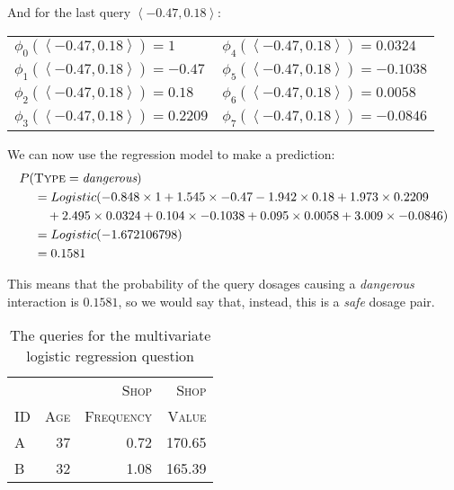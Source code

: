 \documentclass[solution]{ditpaper}
\begin{document}
\begin{enumerate}
\begin{answer}
And for the last query $\left<-0.47, 0.18\right>$:
			\begin{center}
\begin{tabular}[ht]{ l  l  }
$\phi_0(\left<-0.47, 0.18\right>) =  1$ & $\phi_4(\left<-0.47, 0.18\right>) = 0.0324$ \\
$\phi_1(\left<-0.47, 0.18\right>) = -0.47$ & $\phi_5(\left<-0.47, 0.18\right>) = -0.1038$ \\
$\phi_2(\left<-0.47, 0.18\right>) = 0.18$ &$\phi_6(\left<-0.47, 0.18\right>) = 0.0058$  \\
$\phi_3(\left<-0.47, 0.18\right>) = 0.2209$ & $\phi_7(\left<-0.47, 0.18\right>) = -0.0846$ \\
\end{tabular}
\end{center}
	We can now use the regression model to make a prediction:
		\begin{alignat*}{2}				
P(&\textsc{Type}=\textit{dangerous}) \\
& = Logistic(-0.848\times 1 + 1.545 \times -0.47 -1.942 \times  0.18 + 1.973 \times 0.2209 \\
&  ~~~  +  2.495   \times 0.0324 + 0.104 \times -0.1038 + 0.095 \times 0.0058 + 3.009\times -0.0846) \\
& = Logistic(-1.672106798)  \\
& = 0.1581 
\end{alignat*}
 
\noindent This means that the probability of the query dosages causing a \textit{dangerous} interaction is $0.1581$, so we would say that, instead, this is a \textit{safe} dosage pair. 
		\end{answer}
		\end{enumerate}

\clearpage

\begin{table}[htb]
\caption{The queries for the multivariate logistic regression question}
\label{tab:logregress}
\begin{center}
\begin{tabular}{l r r r}
\hline
			 & ~ & \textsc{Shop}  & \textsc{Shop}\\
				\textsc{ID} & \textsc{Age} & \textsc{Frequency}  & \textsc{Value}\\
\hline
A & 37 & 0.72 & 170.65 \\ 
B & 32 & 1.08 & 165.39 \\ 
\hline
\end{tabular}
\end{center}
\end{table}
\end{document}
